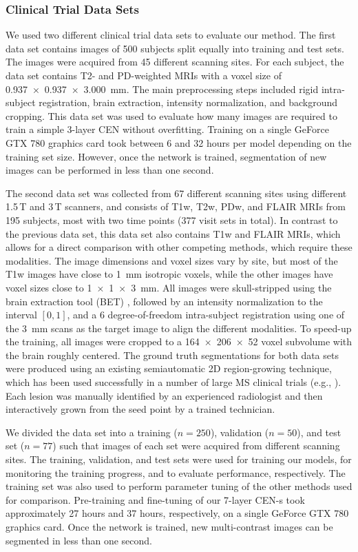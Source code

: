 \subsubsection{Clinical Trial Data Sets}

We used two different clinical trial data sets to evaluate our method. The first
data set contains images of 500 subjects split equally into training and test
sets. The images were acquired from 45 different scanning sites. For each
subject, the data set contains T2- and PD-weighted MRIs with a voxel size of
\SI{0.937x0.937x3.000}{\milli\metre}. The main preprocessing steps included
rigid intra-subject registration, brain extraction, intensity normalization, and
background cropping. This data set was used to evaluate how many images are
required to train a simple 3-layer CEN without overfitting. Training on a
single GeForce GTX 780 graphics card took between 6 and 32 hours per model
depending on the training set size. However, once the network is trained,
segmentation of new images can be performed in less than one second.

The second data set was collected from 67 different scanning sites using
different 1.5\,T and 3\,T scanners, and consists of T1w, T2w, PDw, and FLAIR
MRIs from 195 subjects, most with two time points (377 visit sets in total). In
contrast to the previous data set, this data set also contains T1w and FLAIR
MRIs, which allows for a direct comparison with other competing methods, which
require these modalities. The image dimensions and voxel sizes vary by site, but
most of the T1w images have close to \SI{1}{\milli\meter} isotropic voxels,
while the other images have voxel sizes close to \SI{1x1x3}{\milli\meter}. All
images were skull-stripped using the brain extraction tool (BET)
\citep{jenkinson2005}, followed by an intensity normalization to the
interval $[0,1]$, and a 6 degree-of-freedom intra-subject registration using one
of the \SI{3}{\milli\meter} scans as the target image to align the different
modalities. To speed-up the training, all images were cropped to a
\num{164x206x52} voxel subvolume with the brain roughly centered. The ground
truth segmentations for both data sets were produced using an existing
semiautomatic 2D region-growing technique, which has been used successfully in a
number of large MS clinical trials (e.g.,
\citealp{kappos2006,traboulsee2008}).
Each lesion was manually identified by an experienced radiologist and then
interactively grown from the seed point by a trained technician.

We divided the data set into a training ($n=250$), validation ($n=50$), and test
set ($n=77$) such that images of each set were acquired from different scanning
sites. The training, validation, and test sets were used for training our
models, for monitoring the training progress, and to evaluate performance,
respectively. The training set was also used to perform parameter tuning of the
other methods used for comparison. Pre-training and fine-tuning of our 7-layer
CEN-s took approximately 27 hours and 37 hours, respectively, on a single
GeForce GTX 780 graphics card. Once the network is trained, new multi-contrast
images can be segmented in less than one second.


